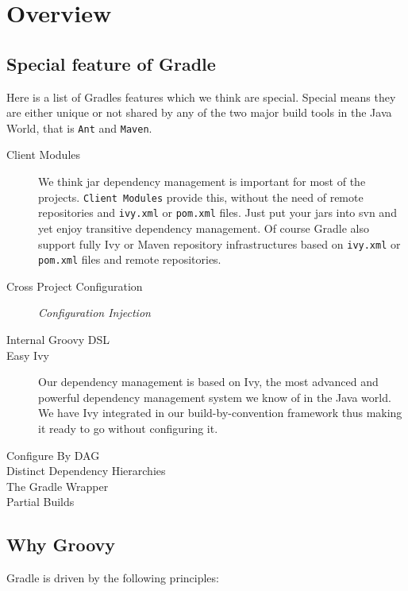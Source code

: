 \chapter{Overview} %
\label{cha:overview}

\section{Special feature of Gradle} %
\label{sec:special_feature_of_gradle}
Here is a list of Gradles features which we think are special. Special means they are either unique or not shared by any of the two major build tools in the Java World, that is \texttt{Ant} and \texttt{Maven}.
\begin{description}
	\item[Client Modules] We think jar dependency management is important for most of the projects. \texttt{Client Modules} provide this, without the need of remote repositories and \texttt{ivy.xml} or \texttt{pom.xml} files. Just put your jars into svn and yet enjoy transitive dependency management. Of course Gradle also support fully Ivy or Maven repository infrastructures based on \texttt{ivy.xml} or \texttt{pom.xml} files and remote repositories.
	\item[Cross Project Configuration] \emph{Configuration Injection}
	\item[Internal Groovy DSL] 
	\item[Easy Ivy] Our dependency management is based on Ivy, the most advanced and powerful dependency management system we know of in the Java world. We have Ivy integrated in our build-by-convention framework thus making it ready to go without configuring it.
	\item[Configure By DAG] 
	\item[Distinct Dependency Hierarchies]
    \item[The Gradle Wrapper]  
    \item[Partial Builds]  
\end{description}

\section{Why Groovy} %
\label{sec:why_groovy}


Gradle is driven by the following principles:

